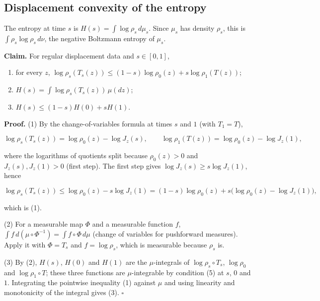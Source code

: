 \documentclass[11pt,a4paper]{report}
\begin{document}
\subsection{\texorpdfstring{Displacement convexity of the entropy}{Displacement convexity of the entropy}}


The entropy at time \(s\) is \(H(s)=\int\log\rho_s\,d\mu_s\). Since \(\mu_s\) has density \(\rho_s\), this is \(\int\rho_s\log\rho_s\,d\nu\), the negative Boltzmann entropy of \(\mu_s\).




\textbf{Claim.} For regular displacement data and \(s\in[0,1]\),



\begin{enumerate}


\item for every \(z\), \(\log\rho_s(T_s(z))\le(1-s)\log\rho_0(z)+s\log\rho_1(T(z))\);

\item \(H(s)=\int\log\rho_s(T_s(z))\,\mu(dz)\);

\item \(H(s)\le(1-s)H(0)+sH(1)\).

\end{enumerate}



\textbf{Proof.} (1) By the change-of-variables formula at times \(s\) and \(1\) (with \(T_1=T\)),


\[\log\rho_s(T_s(z))=\log\rho_0(z)-\log J_z(s),\qquad\log\rho_1(T(z))=\log\rho_0(z)-\log J_z(1),\]


where the logarithms of quotients split because \(\rho_0(z)>0\) and \(J_z(s),J_z(1)>0\) (first step). The first step gives \(\log J_z(s)\ge s\log J_z(1)\), hence


\[\log\rho_s(T_s(z))\le\log\rho_0(z)-s\log J_z(1)=(1-s)\log\rho_0(z)+s\bigl(\log\rho_0(z)-\log J_z(1)\bigr),\]


which is (1).




(2) For a measurable map \(\Phi\) and a measurable function \(f\), \(\int f\,d(\mu\circ\Phi^{-1})=\int f\circ\Phi\,d\mu\) (change of variables for pushforward measures). Apply it with \(\Phi=T_s\) and \(f=\log\rho_s\), which is measurable because \(\rho_s\) is.




(3) By (2), \(H(s)\), \(H(0)\) and \(H(1)\) are the \(\mu\)-integrals of \(\log\rho_s\circ T_s\), \(\log\rho_0\) and \(\log\rho_1\circ T\); these three functions are \(\mu\)-integrable by condition (5) at \(s\), \(0\) and \(1\). Integrating the pointwise inequality (1) against \(\mu\) and using linearity and monotonicity of the integral gives (3). \(\square\)
\end{document}
